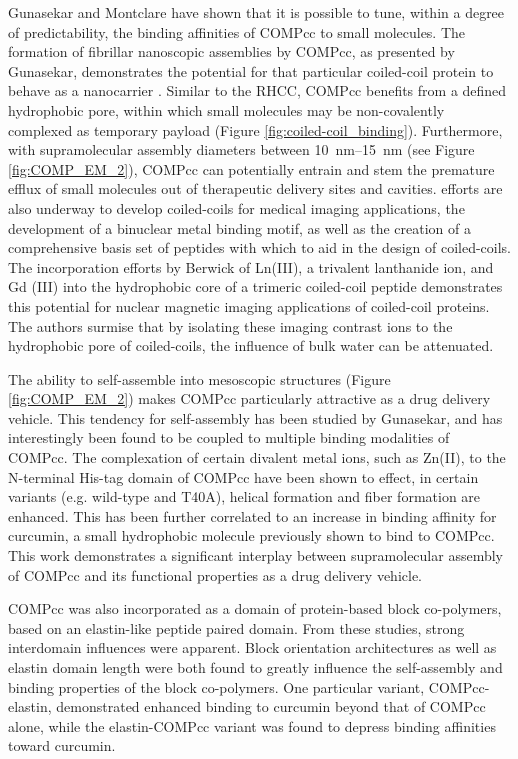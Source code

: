 \begin{refsection}
Gunasekar and Montclare have shown that it is possible to tune, within a degree
of predictability, the binding affinities of COMPcc to small
molecules.\cite{Gunasekar2009} The formation of fibrillar nanoscopic assemblies
by COMPcc, as presented by Gunasekar,\cite{Gunasekar2012} demonstrates the
potential for that particular coiled-coil protein to behave as a nanocarrier
. Similar to the RHCC, COMPcc benefits from a defined hydrophobic
pore, within which small molecules may be non-covalently complexed as temporary
payload (Figure \ref{fig:coiled-coil_binding}).  Furthermore, with
supramolecular assembly diameters between \SIrange{10}{15}{\nm} (see Figure
\ref{fig:COMP_EM_2}), COMPcc can potentially entrain and stem the premature
efflux of small molecules out of therapeutic delivery sites and cavities.
 efforts are also underway to develop coiled-coils for medical
imaging applications, the development of a binuclear metal binding motif, as
well as the creation of a comprehensive basis set of peptides with which to aid
in the design of 
coiled-coils.\cite{Shiga2012,Fletcher2012,Berwick2014} The incorporation efforts
by Berwick  of Ln(III), a trivalent lanthanide ion, and Gd (III)
into the hydrophobic core of a trimeric  coiled-coil peptide
demonstrates this potential for nuclear magnetic imaging applications of
coiled-coil proteins.\cite{Berwick2014} The authors surmise that by isolating
these imaging contrast ions to the hydrophobic pore of coiled-coils, the
influence of bulk water can be attenuated.

The ability to self-assemble into mesoscopic structures (Figure
\ref{fig:COMP_EM_2}) makes COMPcc particularly attractive as a drug delivery
vehicle. This tendency for self-assembly has been studied by Gunasekar, and has
interestingly been found to be coupled to multiple binding modalities of
COMPcc.\cite{Gunasekar2012} The complexation of certain divalent metal ions,
such as Zn(II), to the N-terminal His-tag domain of COMPcc have been shown to
effect, in certain variants (e.g. wild-type and T40A), helical formation and
fiber formation are enhanced. This has been further correlated to an increase in
binding affinity for curcumin, a small hydrophobic molecule previously shown to
bind to COMPcc.\cite{Haghpanah2010} This work demonstrates a significant
interplay between supramolecular assembly of COMPcc and its functional
properties as a drug delivery vehicle.

COMPcc was also incorporated as a domain of protein-based block co-polymers,
based on an elastin-like peptide paired
domain.\cite{Haghpanah2010,Yuvienco2012,Dai2011,Haghpanah2009} From these
studies, strong interdomain influences were apparent. Block orientation
architectures as well as elastin domain length were both found to greatly
influence the self-assembly and binding properties of the block co-polymers.
One particular variant, COMPcc-elastin, demonstrated enhanced binding to
curcumin beyond that of COMPcc alone, while the elastin-COMPcc variant was found
to depress binding affinities toward curcumin.\cite{Haghpanah2010}


\end{refsection}
